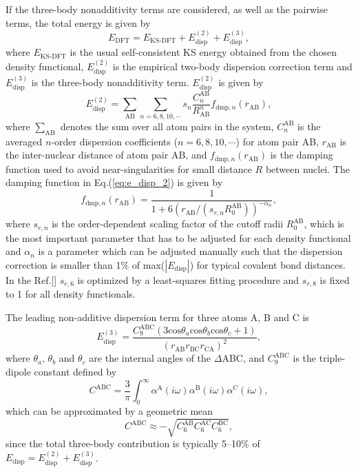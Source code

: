 If the three-body nonadditivity terms are considered, as well as the pairwise terms, the total energy is given by 
\begin{equation}
    E_{\text{DFT}} = E_{\text{KS-DFT}}+E_{\text{disp}}^{(2)}+E_{\text{disp}}^{(3)},
\label{eq:e_dftd3}
\end{equation}
where $E_{\text{KS-DFT}}$ is the usual self-consistent KS energy obtained from the chosen density functional, $E_{\text{disp}}^{(2)}$ is the empirical two-body  dispersion correction term and $E_{\text{disp}}^{(3)}$ is the three-body nonadditivity term. $E_{\text{disp}}^{(2)}$ is given by
\begin{equation}
    E_{\text{disp}}^{(2)} = \sum_{\text{AB}}\sum_{n=6,8,10,\cdots}s_n\frac{C_n^{\text{AB}}}{R_{\text{AB}}^n}f_{\text{dmp},n}(r_{\text{AB}}),
    \label{eq:e_disp_2}
\end{equation}
where $\sum\limits_{\text{AB}}$ denotes the sum over all atom pairs in the system,
$C_n^{\text{AB}}$ is the averaged $n$-order dispersion coefficients ($n=6{,}8{,}10{,}\cdots$) for atom pair AB,
$r_{\text{AB}}$  is the inter-nuclear distance of atom pair AB,
and $f_{\text{dmp},n}(r_{\text{AB}})$ is the damping function used to avoid near-singularities for small distance $R$  between nuclei.
The damping function in Eq.\thinspace(\ref{eq:e_disp_2}) is given by 
\begin{equation}
    f_{\text{dmp},n}(r_{\text{AB}}) = \frac{1}{1+6(r_{\text{AB}}/(s_{r,n}R_0^{\text{AB}}))^{-\alpha_n}},
    \label{eq:e_damping}
\end{equation}
where $s_{r,n}$ is the order-dependent scaling factor of the cutoff radii $R_0^{\text{AB}}$, 
which is the most important parameter that has to be adjusted for each density functional 
and $\alpha_n$ is a parameter which can be adjusted manually such that the dispersion correction is 
smaller than 1\% of max($|E_{\text{disp}}|$) for typical covalent bond distances.
In the Ref.[\cite{Grimme10}] $s_{r,6}$ is optimized by a least-squares fitting procedure and $s_{r,8}$ is fixed to 1 for all density functionals.

The leading non-additive dispersion term for three atoms A, B and C is
\begin{equation}
    E_{\text{disp}}^{(3)} =\frac{C_9^{\text{ABC}}(3\text{cos}\theta_a\text{cos}\theta_b \text{cos}\theta_c+1)}{(r_{\text{AB}}r_{\text{BC}}r_{\text{CA}})^2},
\label{eq:e_ABC}
\end{equation}
where $\theta_a$, $\theta_b$ and $\theta_c$ are the internal angles of the $\Delta$ABC,
and $C_9^{\text{ABC}}$ is the triple-dipole constant defined by 
\begin{equation}
  C^{\text{ABC}} =\frac{3}{\pi}\int_0^{\infty}\alpha^{\text{A}}(i\omega)\alpha^{\text{B}}(i\omega)\alpha^{\text{C}}(i\omega),
\label{eq:C_ABC}
\end{equation}
which can be approximated by a geometric mean
\begin{equation}
C^{\text{ABC}} \approx -\sqrt{C_6^{\text{AB}}C_6^{\text{AC}}C_6^{\text{BC}}},
\label{eq:C_ABC_approx}
\end{equation}
since the total three-body contribution is typically 5--10\% of $E_{\text{disp}}=E_{\text{disp}}^{(2)}+E_{\text{disp}}^{(3)}$.
%
